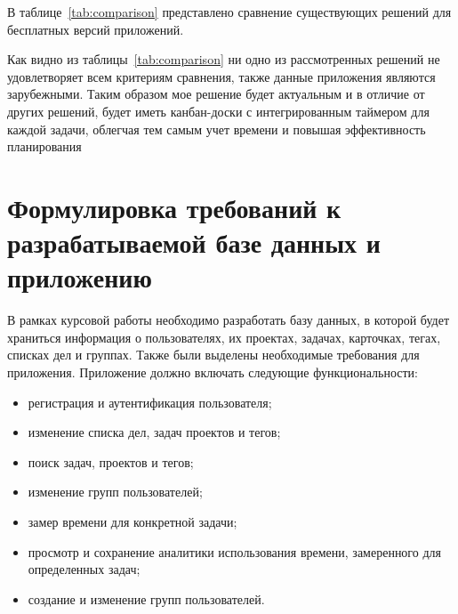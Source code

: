 В таблице~\ref{tab:comparison} представлено сравнение существующих решений для бесплатных версий приложений.

\begin{table}[H]
	\centering
	\caption{Сравнение существующих решений}
	\label{tab:comparison}
\end{table}


Как видно из таблицы~\ref{tab:comparison} ни одно из рассмотренных решений не удовлетворяет всем критериям сравнения, также данные приложения являются зарубежными.
Таким образом мое решение будет актуальным и в отличие от других решений, будет иметь канбан-доски с интегрированным таймером для каждой задачи, облегчая тем самым учет времени и повышая эффективность планирования


\section {Формулировка требований к разрабатываемой базе данных и приложению}

В рамках курсовой работы необходимо разработать базу данных, в которой будет храниться информация о пользователях, их проектах, задачах, карточках, тегах, списках дел и группах.
Также были выделены необходимые требования для приложения.
Приложение должно включать следующие функциональности:
\begin{itemize}
	\item регистрация и аутентификация пользователя;
	\item изменение списка дел, задач проектов и тегов;
	\item поиск задач, проектов и тегов;
	\item изменение групп пользователей;
	\item замер времени для конкретной задачи;
	\item просмотр и сохранение аналитики использования времени, замеренного для определенных задач;
	\item создание и изменение групп пользователей.
\end{itemize}

